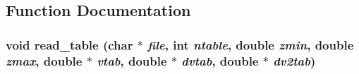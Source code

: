 \subsection{Function Documentation}
\subsubsection{\setlength{\rightskip}{0pt plus 5cm}void read\_\-table (char $\ast$ {\em file}, int {\em ntable}, double {\em zmin}, double {\em zmax}, double $\ast$ {\em vtab}, double $\ast$ {\em dvtab}, double $\ast$ {\em dv2tab})}\label{read__table_8c_301c3c5dd44f22f60b06c27634625dc1}



